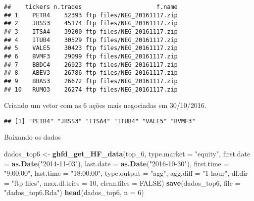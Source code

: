 \documentclass[]{article}
\newenvironment{Shaded}{\begin{snugshade}}{\end{snugshade}}
\newcommand{\KeywordTok}[1]{\textcolor[rgb]{0.13,0.29,0.53}{\textbf{{#1}}}}
\newcommand{\DataTypeTok}[1]{\textcolor[rgb]{0.13,0.29,0.53}{{#1}}}
\newcommand{\DecValTok}[1]{\textcolor[rgb]{0.00,0.00,0.81}{{#1}}}
\newcommand{\StringTok}[1]{\textcolor[rgb]{0.31,0.60,0.02}{{#1}}}
\newcommand{\OtherTok}[1]{\textcolor[rgb]{0.56,0.35,0.01}{{#1}}}
\newcommand{\NormalTok}[1]{{#1}}
\begin{document}
\begin{verbatim}
##    tickers n.trades                     f.name
## 1    PETR4    52393 ftp files/NEG_20161117.zip
## 2    JBSS3    45174 ftp files/NEG_20161117.zip
## 3    ITSA4    39200 ftp files/NEG_20161117.zip
## 4    ITUB4    30529 ftp files/NEG_20161117.zip
## 5    VALE5    30423 ftp files/NEG_20161117.zip
## 6    BVMF3    29099 ftp files/NEG_20161117.zip
## 7    BBDC4    26923 ftp files/NEG_20161117.zip
## 8    ABEV3    26786 ftp files/NEG_20161117.zip
## 9    BBAS3    26672 ftp files/NEG_20161117.zip
## 10   RUMO3    26274 ftp files/NEG_20161117.zip
\end{verbatim}

Criando um vetor com as 6 ações mais negociadas em 30/10/2016.

\begin{Shaded}
\end{Shaded}

\begin{verbatim}
## [1] "PETR4" "JBSS3" "ITSA4" "ITUB4" "VALE5" "BVMF3"
\end{verbatim}

Baixando os dados

\begin{Shaded}
\begin{Highlighting}[]
\NormalTok{dados_top6 <-}\StringTok{ }\KeywordTok{ghfd_get_HF_data}\NormalTok{(top_6, }\DataTypeTok{type.market =} \StringTok{"equity"}\NormalTok{, }\DataTypeTok{first.date =} \KeywordTok{as.Date}\NormalTok{(}\StringTok{"2014-11-03"}\NormalTok{), }
    \DataTypeTok{last.date =} \KeywordTok{as.Date}\NormalTok{(}\StringTok{"2016-10-30"}\NormalTok{), }\DataTypeTok{first.time =} \StringTok{"9:00:00"}\NormalTok{, }\DataTypeTok{last.time =} \StringTok{"18:00:00"}\NormalTok{, }
    \DataTypeTok{type.output =} \StringTok{"agg"}\NormalTok{, }\DataTypeTok{agg.diff =} \StringTok{"1 hour"}\NormalTok{, }\DataTypeTok{dl.dir =} \StringTok{"ftp files"}\NormalTok{, }\DataTypeTok{max.dl.tries =} \DecValTok{10}\NormalTok{, }
    \DataTypeTok{clean.files =} \OtherTok{FALSE}\NormalTok{)}
\KeywordTok{save}\NormalTok{(dados_top6, }\DataTypeTok{file =} \StringTok{"dados_top6.Rda"}\NormalTok{)}
\KeywordTok{head}\NormalTok{(dados_top6, }\DataTypeTok{n =} \DecValTok{6}\NormalTok{)}
\end{Highlighting}
\end{Shaded}
\end{document}
